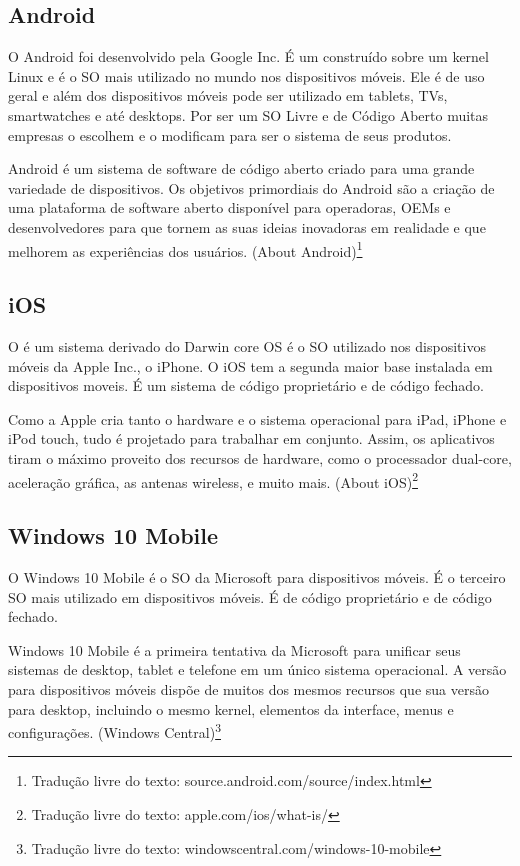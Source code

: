 \subsection{Android}
O Android foi desenvolvido pela Google Inc. É um  construído sobre um kernel Linux e é o SO mais utilizado no mundo nos dispositivos móveis. Ele é de uso geral e além dos dispositivos móveis pode ser utilizado em tablets, TVs, smartwatches e até desktops. Por ser um SO Livre e de Código Aberto muitas empresas o escolhem e o modificam para ser o sistema de seus produtos.
\begin{citacao}
Android é um sistema de software de código aberto criado para uma grande variedade de dispositivos. Os objetivos primordiais do Android são a criação de uma plataforma de software aberto disponível para operadoras, OEMs e desenvolvedores para que tornem as suas ideias inovadoras em realidade e que melhorem as experiências dos usuários. (About Android)\footnote{Tradução livre do texto: source.android.com/source/index.html}
\end{citacao}

\subsection{iOS}
O  é um sistema derivado do Darwin core OS é o SO utilizado nos dispositivos móveis da Apple Inc., o iPhone. O iOS tem a segunda maior base instalada em dispositivos moveis. É um sistema de código proprietário e de código fechado.
\begin{citacao}
Como a Apple cria tanto o hardware e o sistema operacional para iPad, iPhone e iPod touch, tudo é projetado para trabalhar em conjunto. Assim, os aplicativos tiram o máximo proveito dos recursos de hardware, como o processador dual-core, aceleração gráfica, as antenas wireless, e muito mais. (About iOS)\footnote{Tradução livre do texto: apple.com/ios/what-is/}
\end{citacao}

\subsection{Windows 10 Mobile}
O Windows 10 Mobile é o SO da Microsoft para dispositivos móveis. É o terceiro SO mais utilizado em dispositivos móveis. É de código proprietário e de código fechado.
\begin{citacao}
Windows 10 Mobile é a primeira tentativa da Microsoft para unificar seus sistemas de desktop, tablet e telefone em um único sistema operacional. A versão para dispositivos móveis dispõe de muitos dos mesmos recursos que sua versão para desktop, incluindo o mesmo kernel, elementos da interface, menus e configurações. (Windows Central)\footnote{Tradução livre do texto: windowscentral.com/windows-10-mobile}
\end{citacao}

